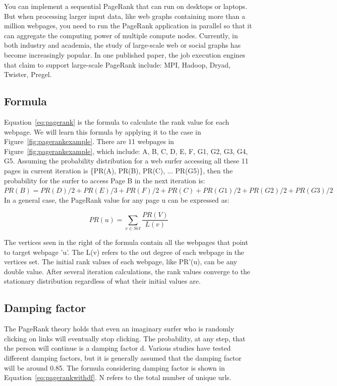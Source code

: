 \documentclass{article}
\begin{document}
You can implement a sequential PageRank that can run on desktops or laptops. But when processing larger input data, like web graphs containing more than a million webpages, you need to run the PageRank application in parallel so that it can aggregate the computing power of multiple compute nodes. Currently, in both industry and academia, the study of large-scale web or social graphs has become increasingly popular. In one published paper, the job execution engines that claim to support large-scale PageRank include: MPI, Hadoop, Dryad, Twister, Pregel. 

\subsection*{Formula}

Equation~\ref{eq:pagerank} is the formula to calculate the rank value for each webpage. We will learn this formula by applying it to the case in Figure~\ref{fig:pagerankexample}. There are 11 webpages in Figure~\ref{fig:pagerankexample}, which include: {A, B, C, D, E, F, G1, G2, G3, G4, G5}. Assuming the probability distribution for a web surfer accessing all these 11 pages in current iteration is \{PR(A), PR(B), PR(C), ... PR(G5)\}, then the probability for the surfer to access Page B in the next iteration is: \\

$PR(B) = PR(D)/2 + PR(E)/3 + PR(F)/2 + PR(C) + PR(G1)/2 + PR(G2)/2 + PR(G3)/2 $\\


In a general case, the PageRank value for any page u can be expressed as:

\begin{equation}\label{eq:pagerank}
PR(u) = \sum_{v \in Set} \frac{PR(V)}{L(v)}
\end{equation}

The vertices seen in the right of the formula contain all the webpages that point to target webpage 'u'. The L(v) refers to the out degree of each webpage in the vertices set. The initial rank values of each webpage, like PR'(u), can be any double value. After several iteration calculations, the rank values converge to the stationary distribution regardless of what their initial values are.

\subsection*{Damping factor}
The PageRank theory holds that even an imaginary surfer who is randomly clicking on links will eventually stop clicking. The probability, at any step, that the person will continue is a damping factor d. Various studies have tested different damping factors, but it is generally assumed that the damping factor will be around 0.85. The formula considering damping factor is shown in Equation~\ref{eq:pagerankwithdf}. N refers to the total number of unique urls. 
\end{document}
